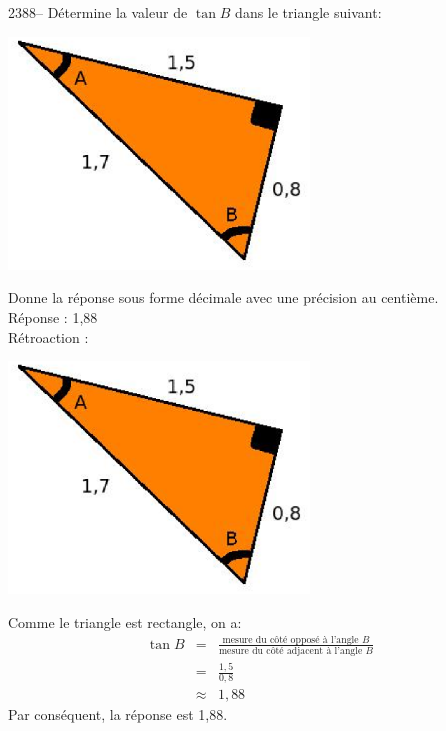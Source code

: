 \documentclass[letterpaper, 12pt]{article}
\begin{document}
2388-- D\'etermine la valeur de $\tan{B}$ dans le triangle suivant:
\begin{center}
 \includegraphics[width=8cm,bb=14 14 415 315]{Q2387.eps}
\end{center}
Donne la r\'eponse sous forme d\'ecimale avec une pr\'ecision au centi\`eme.\\

R\'eponse : 1,88\\

R\'etroaction :\\
\begin{center}
 \includegraphics[width=8cm,bb=14 14 415 315]{Q2387.eps}
\end{center}
Comme le triangle est rectangle, on a:
\begin{eqnarray*}
 \tan{B}&=&\frac{\textrm{mesure du c\^ot\'e oppos\'e \`a l'angle $B$}}{\textrm{mesure du c\^ot\'e adjacent \`a l'angle $B$}}\\
&=&\frac{1,5}{0,8}\\[2mm]
&\approx&1,88
\end{eqnarray*}
Par cons\'equent, la r\'eponse est 1,88.\\
\end{document}
